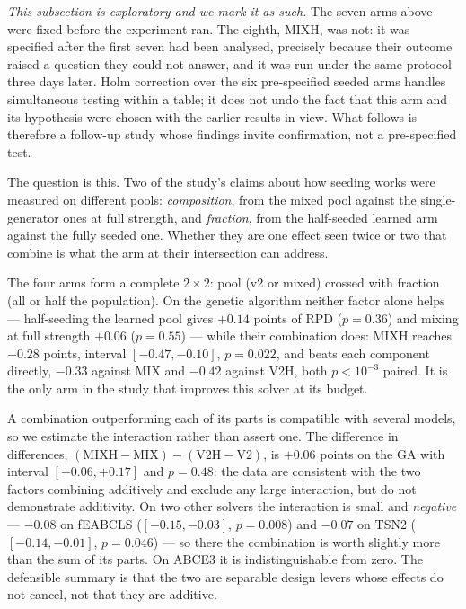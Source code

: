 \documentclass[review]{elsarticle}
\begin{document}
\emph{This subsection is exploratory and we mark it as such.} The seven arms
above were fixed before the experiment ran. The eighth, MIXH, was not: it
was specified after the first seven had been analysed, precisely because
their outcome raised a question they could not answer, and it was run under
the same protocol three days later. Holm correction over the six pre-specified seeded
arms handles simultaneous testing within a table; it does not undo the fact
that this arm and its hypothesis were chosen with the earlier results in
view. What follows is therefore a follow-up study whose findings invite
confirmation, not a pre-specified test.

The question is this. Two of the study's claims about how seeding works
were measured on different pools: \emph{composition}, from the mixed pool
against the single-generator ones at full strength, and \emph{fraction},
from the half-seeded learned arm against the fully seeded one. Whether they
are one effect seen twice or two that combine is what the arm at their
intersection can address.

The four arms form a complete $2\times2$: pool (v2 or mixed) crossed with
fraction (all or half the population). On the genetic algorithm neither
factor alone helps --- half-seeding the learned pool gives $+0.14$ points
of RPD ($p=0.36$) and mixing at full strength $+0.06$ ($p=0.55$) --- while
their combination does: MIXH reaches $-0.28$ points, interval
$[-0.47,-0.10]$, $p=0.022$, and beats each component directly, $-0.33$
against MIX and $-0.42$ against V2H, both $p<10^{-3}$ paired. It is the only
arm in the study that improves this solver at its budget.

A combination outperforming each of its parts is compatible with several
models, so we estimate the interaction rather than assert one. The
difference in differences, $(\mathrm{MIXH}-\mathrm{MIX}) -
(\mathrm{V2H}-\mathrm{V2})$, is $+0.06$ points on the GA with interval
$[-0.06,+0.17]$ and $p=0.48$: the data are consistent with the two factors
combining additively and exclude any large interaction, but do not
demonstrate additivity. On two other solvers the interaction is small and
\emph{negative} --- $-0.08$ on fEABCLS ($[-0.15,-0.03]$, $p=0.008$) and
$-0.07$ on TSN2 ($[-0.14,-0.01]$, $p=0.046$) --- so there the combination
is worth slightly more than the sum of its parts. On ABCE3 it is
indistinguishable from zero. The defensible summary is that the two are
separable design levers whose effects do not cancel, not that they are
additive.
\end{document}
